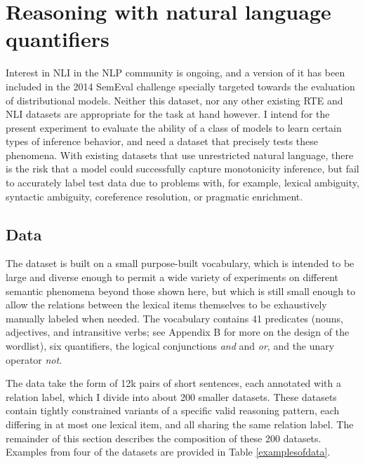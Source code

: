 \section{Reasoning with natural language quantifiers}


Interest in NLI in the NLP community is ongoing, and a version of it has been included in the 2014 SemEval challenge specially targeted towards the evaluation of distributional models. Neither this dataset, nor any other existing RTE and NLI datasets are appropriate for the task at hand however. I intend for the present experiment to evaluate the ability of a class of models to learn certain types of inference behavior, and need a dataset that precisely tests these phenomena. With existing datasets that use unrestricted natural language, there is the risk that a model could successfully capture monotonicity inference, but fail to accurately label test data due to problems with, for example, lexical ambiguity, syntactic ambiguity, coreference resolution, or pragmatic enrichment.

\subsection{Data}

The dataset is built on a small purpose-built vocabulary, which is intended to be large and diverse enough to permit a wide variety of experiments on different semantic phenomena beyond those shown here, but which is still small enough to allow the relations between the lexical items themselves to be exhaustively manually labeled when needed. The vocabulary contains 41 predicates (nouns, adjectives, and intransitive verbs; see Appendix B for more on the design of the wordlist), six quantifiers, the logical conjunctions \emph{and} and \emph{or}, and the unary operator \emph{not}.

The data take the form of 12k pairs of short sentences, each annotated with a relation label, which I divide into about 200 smaller datasets. These datasets contain tightly constrained variants of a specific valid reasoning pattern, each differing in at most one lexical item, and all sharing the same relation label. The remainder of this section describes the composition of these 200 datasets. Examples from four of the datasets are provided in Table \ref{examplesofdata}.

